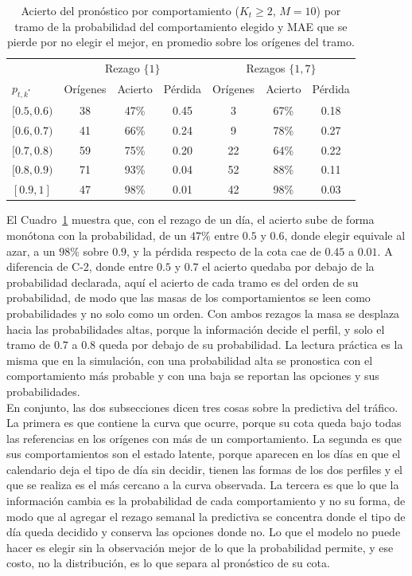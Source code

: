\begin{table}[H]
\centering\small
\setlength{\tabcolsep}{3.5pt}
\caption{Acierto del pronóstico por comportamiento ($K_t \ge 2$, $M = 10$) por tramo de la probabilidad del comportamiento elegido y MAE que se pierde por no elegir el mejor, en promedio sobre los orígenes del tramo.}
\label{tab:apl_acierto_p1}
\begin{tabular}{l ccc ccc}
\hline
 & \multicolumn{3}{c}{Rezago $\{1\}$} & \multicolumn{3}{c}{Rezagos $\{1,7\}$} \\
$p_{t,k^{*}}$ & Orígenes & Acierto & Pérdida & Orígenes & Acierto & Pérdida \\
\hline
$[0.5, 0.6)$ & 38 & 47\% & 0.45 & 3 & 67\% & 0.18 \\
$[0.6, 0.7)$ & 41 & 66\% & 0.24 & 9 & 78\% & 0.27 \\
$[0.7, 0.8)$ & 59 & 75\% & 0.20 & 22 & 64\% & 0.22 \\
$[0.8, 0.9)$ & 71 & 93\% & 0.04 & 52 & 88\% & 0.11 \\
$[0.9, 1]$ & 47 & 98\% & 0.01 & 42 & 98\% & 0.03 \\
\hline
\end{tabular}
\end{table}

El Cuadro~\ref{tab:apl_acierto_p1} muestra que, con el rezago de un día, el acierto sube de forma monótona con la probabilidad, de un $47\%$ entre $0.5$ y $0.6$, donde elegir equivale al azar, a un $98\%$ sobre $0.9$, y la pérdida respecto de la cota cae de $0.45$ a $0.01$. A diferencia de C-2, donde entre $0.5$ y $0.7$ el acierto quedaba por debajo de la probabilidad declarada, aquí el acierto de cada tramo es del orden de su probabilidad, de modo que las masas de los comportamientos se leen como probabilidades y no solo como un orden. Con ambos rezagos la masa se desplaza hacia las probabilidades altas, porque la información decide el perfil, y solo el tramo de $0.7$ a $0.8$ queda por debajo de su probabilidad. La lectura práctica es la misma que en la simulación, con una probabilidad alta se pronostica con el comportamiento más probable y con una baja se reportan las opciones y sus probabilidades.\\

En conjunto, las dos subsecciones dicen tres cosas sobre la predictiva del tráfico. La primera es que contiene la curva que ocurre, porque su cota queda bajo todas las referencias en los orígenes con más de un comportamiento. La segunda es que sus comportamientos son el estado latente, porque aparecen en los días en que el calendario deja el tipo de día sin decidir, tienen las formas de los dos perfiles y el que se realiza es el más cercano a la curva observada. La tercera es que lo que la información cambia es la probabilidad de cada comportamiento y no su forma, de modo que al agregar el rezago semanal la predictiva se concentra donde el tipo de día queda decidido y conserva las opciones donde no. Lo que el modelo no puede hacer es elegir sin la observación mejor de lo que la probabilidad permite, y ese costo, no la distribución, es lo que separa al pronóstico de su cota.


